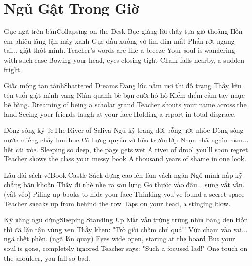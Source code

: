 \chapter{Ngủ Gật Trong Giờ}

\begin{tutuyetbox}{Gục ngã trên bàn}{Collapsing on the Desk}
Bục giảng lời thầy tựa gió thoảng
Hồn em phiêu lãng tận mây xanh
Gục đầu xuống vở lim dim mắt
Phấn rớt ngang tai... giật thót mình.
\tcblower
Teacher's words are like a breeze 
Your soul is wandering with such ease 
Bowing your head, eyes closing tight 
Chalk falls nearby, a sudden fright.
\end{tutuyetbox}

\begin{tutuyetbox}{Giấc mộng tan tành}{Shattered Dreams}
Đang lúc nằm mơ thi đỗ trạng
Thầy kêu tên tuổi giật mình vang
Nhìn quanh bè bạn cười hô hố
Kiểm điểm cầm tay nhục bẽ bàng.
\tcblower
Dreaming of being a scholar grand 
Teacher shouts your name across the land 
Seeing your friends laugh at your face 
Holding a report in total disgrace.
\end{tutuyetbox}

\begin{tutuyetbox}{Dòng sông ký ức}{The River of Saliva}
Ngủ kỹ trang đời bỗng ướt nhòe
Dòng sông nước miếng chảy hoe hoe
Cô bưng quyển vở bêu trước lớp
Nhục nhã nghìn năm... hết cãi xòe.
\tcblower
Sleeping so deep, the page gets wet
A river of drool you'll soon regret
Teacher shows the class your messy book
A thousand years of shame in one look.
\end{tutuyetbox}

\begin{tutuyetbox}{Lâu đài sách vở}{Book Castle}
Sách dựng cao lên làm vách ngăn
Ngỡ mình nấp kỹ chẳng băn khoăn
Thầy đi nhè nhẹ ra sau lưng
Gõ thước vào đầu... sưng vắt vần. (vắt vẻo)
\tcblower
Piling up books to hide your face
Thinking you've found a secret space
Teacher sneaks up from behind the row
Taps on your head, a stinging blow.
\end{tutuyetbox}

\begin{tutuyetbox}{Kỹ năng ngủ đứng}{Sleeping Standing Up}
Mắt vẫn trừng trừng nhìn bảng đen
Hồn thì đã lặn tận vùng ven
Thầy khen: "Trò giỏi chăm chú quá!"
Vừa chạm vào vai... ngã chết phèn. (ngã lăn quay)
\tcblower
Eyes wide open, staring at the board
But your soul is gone, completely ignored
Teacher says: "Such a focused lad!"
One touch on the shoulder, you fall so bad.
\end{tutuyetbox}


